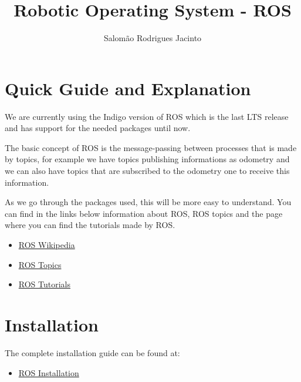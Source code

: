 \documentclass{article}
\title{Robotic Operating System - ROS}
\author{Salomão Rodrigues Jacinto}
\begin{document}
\maketitle

\section{Quick Guide and Explanation}
We are currently using the Indigo version of ROS which is the last LTS release
and has support for the needed packages until now.

The basic concept of ROS is the message-passing between processes that is made
by topics, for example we have topics publishing informations as odometry and we
can also have topics that are subscribed to the odometry one to receive this
information.

As we go through the packages used, this will be more easy to understand. You
can find in the links below information about ROS, ROS topics and the page where
you can find the tutorials made by ROS.

\begin{itemize}
\item \href{https://en.wikipedia.org/wiki/Robot_Operating_System}{ROS Wikipedia}
\item \href{http://wiki.ros.org/ROS/Tutorials/UnderstandingTopics}{ROS Topics}
\item \href{http://wiki.ros.org/ROS/Tutorials}{ROS Tutorials}
\end{itemize}


\section{Installation}
The complete installation guide can be found at:
\begin{itemize}
\item \href{http://wiki.ros.org/indigo/Installation/Ubuntu}{ROS Installation}
\end{itemize}
\end{document}
